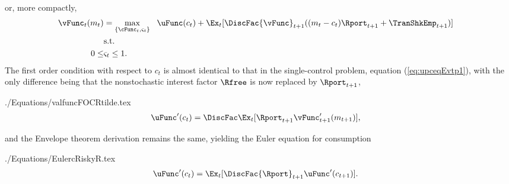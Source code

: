 \documentclass[titlepage, headings=optiontotocandhead]{\econtex}
\begin{document}
\unskip
or, more compactly,
\begin{equation*}\begin{gathered}\begin{aligned}
      {\vFunc}_{t}({m}_{t})  & = \max_{\{\cFunc_{t},\varsigma_{t}\}} ~~  \uFunc({c}_{t}) +  \Ex_{t}[\DiscFac {\vFunc}_{t+1}(({m}_{t}-{c}_{t}){\Rport}_{t+1} +        {\TranShkEmp}_{t+1})]
      \\                       & \text{s.t.} & \nonumber
      \\ 0 \leq & \varsigma_{t} \leq 1
      .
    \end{aligned}\end{gathered}\end{equation*}
The first order condition with respect to ${c}_{t}$ is almost identical
to that in the single-control problem, equation (\ref{eq:upceqEvtp1}),
with the only difference being that the nonstochastic interest factor
$\Rfree$ is now replaced by ${\Rport}_{t+1}$,
\begin{verbatimwrite}{./Equations/valfuncFOCRtilde.tex}
  \begin{equation}\begin{gathered}\begin{aligned}
        \uFunc^{\prime}({c}_{t})  & = \DiscFac \Ex_{t} [{\Rport}_{t+1} \vFunc^{\prime}_{t+1}({m}_{t+1})] \label{eq:valfuncFOCRtilde},
      \end{aligned}\end{gathered}\end{equation}
\end{verbatimwrite}
\unskip
and the Envelope theorem derivation remains the same, 
yielding the Euler equation for consumption
\begin{verbatimwrite}{./Equations/EulercRiskyR.tex}
  \begin{equation}\begin{gathered}\begin{aligned}
        \uFunc^{\prime}({c}_{t})  & = \Ex_{t}[\DiscFac {\Rport}_{t+1} \uFunc^{\prime}({c}_{t+1})]. \label{eq:EulercRiskyR}
      \end{aligned}\end{gathered}\end{equation}
\end{verbatimwrite}
\unskip
\end{document}
